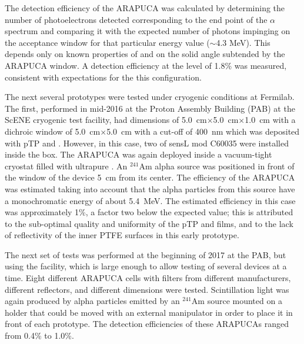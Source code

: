 The detection efficiency of the ARAPUCA was calculated by  determining the number of photoelectrons detected corresponding to the end point of the $\alpha$ spectrum and comparing it with the expected number of photons impinging on the acceptance window for that  particular energy value ($\sim$4.3 MeV).  This depends only on known properties of \lar and on the solid 
angle subtended by the ARAPUCA window. A detection efficiency at the level of 1.8\%  was measured, consistent with  expectations for the this configuration\cite{Marinho:2018doi}.


The next several prototypes were tested under cryogenic conditions at Fermilab.  
The first, performed in mid-2016 at the Proton Assembly Building (PAB) at the ScENE cryogenic test facility, had dimensions of  \SI{5.0}{cm}$\times$\SI{5.0}{cm}$\times$\SI{1.0}{cm} with a dichroic window of \SI{5.0}{cm}$\times$\SI{5.0}{cm} with a cut-off of \SI{400}{nm} which was deposited with pTP and . However, in this case, two of sensL  mod C60035 were installed inside the box.  The ARAPUCA was again deployed inside a vacuum-tight cryostat filled with ultrapure \lar. An $^{241}$Am alpha source was positioned in front of the window of the device \SI{5}{cm} from its center. The efficiency of the ARAPUCA was estimated taking into account that the alpha particles from this source have a  monochromatic energy of about \SI{5.4}{MeV}. 
The estimated efficiency in this case was approximately 1\%, a factor two below the expected value; this is attributed to the sub-optimal quality and uniformity of the pTP and  films, and to the lack of reflectivity of the inner PTFE surfaces in this early prototype.

The next set of tests was performed at the beginning of 2017 at the PAB, but using the  facility, which is large enough to allow testing of several devices at a time. Eight different ARAPUCA cells with filters from different manufacturers, different reflectors, and different dimensions were tested.  Scintillation light was again produced by alpha particles emitted by an $^{241}$Am  source mounted on a holder that could be moved with an external manipulator in order to place it in 
front of each prototype. The detection efficiencies of these ARAPUCAs ranged from 0.4\% to 1.0\%.

